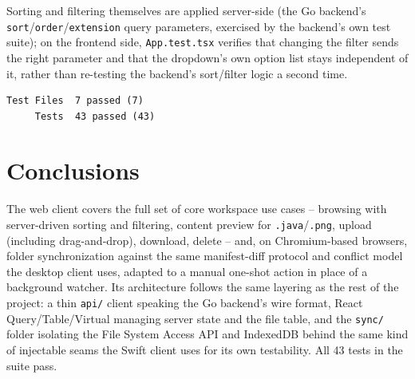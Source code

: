 \documentclass[12pt,a4paper]{article}
\begin{document}
Sorting and filtering themselves are applied server-side (the Go backend's \texttt{sort}/\texttt{order}/\texttt{extension} query parameters, exercised by the backend's own test suite); on the frontend side, \texttt{App.test.tsx} verifies that changing the filter sends the right parameter and that the dropdown's own option list stays independent of it, rather than re-testing the backend's sort/filter logic a second time.

\begin{verbatim}
Test Files  7 passed (7)
     Tests  43 passed (43)
\end{verbatim}

\section{Conclusions}

The web client covers the full set of core workspace use cases -- browsing with server-driven sorting and filtering, content preview for \texttt{.java}/\texttt{.png}, upload (including drag-and-drop), download, delete -- and, on Chromium-based browsers, folder synchronization against the same manifest-diff protocol and conflict model the desktop client uses, adapted to a manual one-shot action in place of a background watcher. Its architecture follows the same layering as the rest of the project: a thin \texttt{api/} client speaking the Go backend's wire format, React Query/Table/Virtual managing server state and the file table, and the \texttt{sync/} folder isolating the File System Access API and IndexedDB behind the same kind of injectable seams the Swift client uses for its own testability. All 43 tests in the suite pass.
\end{document}
